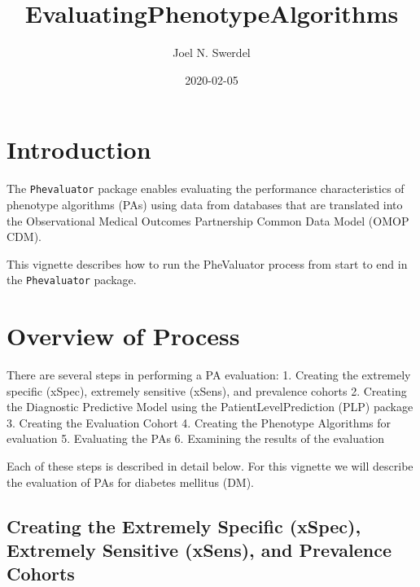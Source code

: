 \documentclass[]{article}
\title{EvaluatingPhenotypeAlgorithms}
\author{Joel N. Swerdel}
\date{2020-02-05}
\begin{document}
\maketitle

{
\setcounter{tocdepth}{3}
\tableofcontents
}
\newpage

\hypertarget{introduction}{%
\section{Introduction}\label{introduction}}

The \texttt{Phevaluator} package enables evaluating the performance
characteristics of phenotype algorithms (PAs) using data from databases
that are translated into the Observational Medical Outcomes Partnership
Common Data Model (OMOP CDM).

This vignette describes how to run the PheValuator process from start to
end in the \texttt{Phevaluator} package.

\hypertarget{overview-of-process}{%
\section{Overview of Process}\label{overview-of-process}}

There are several steps in performing a PA evaluation: 1. Creating the
extremely specific (xSpec), extremely sensitive (xSens), and prevalence
cohorts 2. Creating the Diagnostic Predictive Model using the
PatientLevelPrediction (PLP) package 3. Creating the Evaluation Cohort
4. Creating the Phenotype Algorithms for evaluation 5. Evaluating the
PAs 6. Examining the results of the evaluation

Each of these steps is described in detail below. For this vignette we
will describe the evaluation of PAs for diabetes mellitus (DM).

\hypertarget{creating-the-extremely-specific-xspec-extremely-sensitive-xsens-and-prevalence-cohorts}{%
\subsection{Creating the Extremely Specific (xSpec), Extremely Sensitive
(xSens), and Prevalence
Cohorts}\label{creating-the-extremely-specific-xspec-extremely-sensitive-xsens-and-prevalence-cohorts}}
\end{document}
